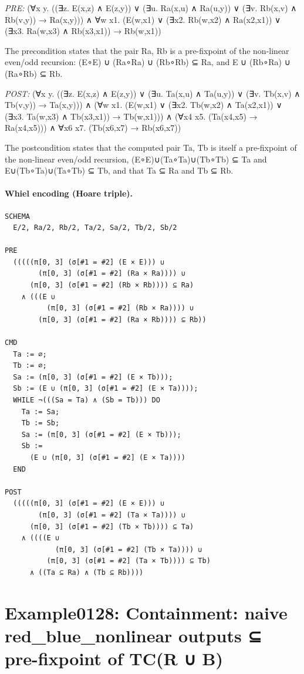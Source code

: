 \documentclass[10pt]{article}
\begin{document}
\textit{PRE:} (∀x y. ((∃z. E(x,z) ∧ E(z,y)) ∨ (∃u. Ra(x,u) ∧ Ra(u,y)) ∨ (∃v. Rb(x,v) ∧ Rb(v,y)) → Ra(x,y))) ∧ ∀w x1. (E(w,x1) ∨ (∃x2. Rb(w,x2) ∧ Ra(x2,x1)) ∨ (∃x3. Ra(w,x3) ∧ Rb(x3,x1)) → Rb(w,x1))\par The precondition states that the pair Ra, Rb is a pre-fixpoint of the non-linear even/odd recursion: (E∘E) ∪ (Ra∘Ra) ∪ (Rb∘Rb) ⊆ Ra, and E ∪ (Rb∘Ra) ∪ (Ra∘Rb) ⊆ Rb.

\textit{POST:} (∀x y. ((∃z. E(x,z) ∧ E(z,y)) ∨ (∃u. Ta(x,u) ∧ Ta(u,y)) ∨ (∃v. Tb(x,v) ∧ Tb(v,y)) → Ta(x,y))) ∧ (∀w x1. (E(w,x1) ∨ (∃x2. Tb(w,x2) ∧ Ta(x2,x1)) ∨ (∃x3. Ta(w,x3) ∧ Tb(x3,x1)) → Tb(w,x1))) ∧ (∀x4 x5. (Ta(x4,x5) → Ra(x4,x5))) ∧ ∀x6 x7. (Tb(x6,x7) → Rb(x6,x7))\par The postcondition states that the computed pair Ta, Tb is itself a pre-fixpoint of the non-linear even/odd recursion, (E∘E)∪(Ta∘Ta)∪(Tb∘Tb) ⊆ Ta and E∪(Tb∘Ta)∪(Ta∘Tb) ⊆ Tb, and that Ta ⊆ Ra and Tb ⊆ Rb.

\paragraph{Whiel encoding (Hoare triple).}

\begin{Verbatim}[fontsize=\scriptsize,breaklines=true,breakanywhere=true,frame=single,framesep=1.5mm]
SCHEMA
  E/2, Ra/2, Rb/2, Ta/2, Sa/2, Tb/2, Sb/2

PRE
  (((((π[0, 3] (σ[#1 = #2] (E × E))) ∪
        (π[0, 3] (σ[#1 = #2] (Ra × Ra)))) ∪
      (π[0, 3] (σ[#1 = #2] (Rb × Rb)))) ⊆ Ra)
    ∧ (((E ∪
          (π[0, 3] (σ[#1 = #2] (Rb × Ra)))) ∪
        (π[0, 3] (σ[#1 = #2] (Ra × Rb)))) ⊆ Rb))

CMD
  Ta := ∅;
  Tb := ∅;
  Sa := (π[0, 3] (σ[#1 = #2] (E × Tb)));
  Sb := (E ∪ (π[0, 3] (σ[#1 = #2] (E × Ta))));
  WHILE ¬(((Sa = Ta) ∧ (Sb = Tb))) DO
    Ta := Sa;
    Tb := Sb;
    Sa := (π[0, 3] (σ[#1 = #2] (E × Tb)));
    Sb :=
      (E ∪ (π[0, 3] (σ[#1 = #2] (E × Ta))))
  END

POST
  (((((π[0, 3] (σ[#1 = #2] (E × E))) ∪
        (π[0, 3] (σ[#1 = #2] (Ta × Ta)))) ∪
      (π[0, 3] (σ[#1 = #2] (Tb × Tb)))) ⊆ Ta)
    ∧ ((((E ∪
            (π[0, 3] (σ[#1 = #2] (Tb × Ta)))) ∪
          (π[0, 3] (σ[#1 = #2] (Ta × Tb)))) ⊆ Tb)
      ∧ ((Ta ⊆ Ra) ∧ (Tb ⊆ Rb))))
\end{Verbatim}

\Needspace{0.45\textheight}

\section{Example0128: Containment: naive red\_blue\_nonlinear outputs ⊆ pre-fixpoint of TC(R ∪ B)}\label{case:Example0128}
\end{document}
